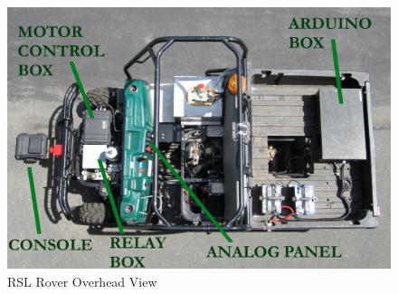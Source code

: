 \begin{figure}[h!]
\begin{center}
\includegraphics[width=.8\textwidth]{Figures/Rover_Overhead.png}
\caption{RSL Rover Overhead View}
\label{roverOver}
\end{center}
\end{figure}












